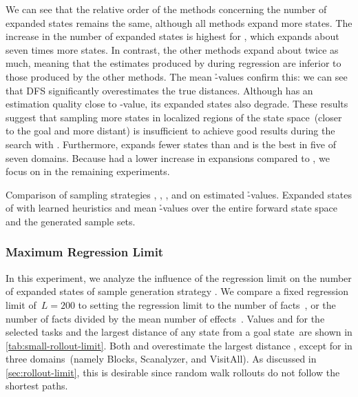 We can see that the relative order of the methods concerning the number of expanded states remains the same, although all methods expand more states. The increase in the number of expanded states is highest for \hnnl{\dfs}, which expands about seven times more states. In contrast, the other methods expand about twice as much, meaning that the estimates produced by \dfs during regression are inferior to those produced by the other methods. The mean \h-values confirm this: we can see that DFS significantly overestimates the true distances. Although \bfs has an estimation quality close to \hstar-value, its expanded states also degrade. These results suggest that sampling more states in localized regions of the state space~(\bfs closer to the goal and \dfs more distant) is insufficient to achieve good results during the search with \gbfs. Furthermore, \hnnl{\bfsrw} expands fewer states than \hnnl{\rw} and is the best in five of seven domains. Because \hnnl{\bfsrw} had a lower increase in expansions compared to \hnnl{\rw}, we focus on \bfsrw in the remaining experiments.

\begin{table}[tb]
    \caption[Comparison of sampling strategies on estimated \h-values.]{Comparison of sampling strategies \bfs, \dfs, \rw, and \bfsrw on estimated \h-values. Expanded states of \gbfs with learned heuristics and mean \h-values over the entire forward state space and the generated sample sets.}
    \label{tab:small-sampling-h}
    \addmargin
    \centering
    
\end{table}

\subsubsection{Maximum Regression Limit}
\label{sec:small-exps-rollout-limit}

In this experiment, we analyze the influence of the regression limit on the number of expanded states of sample generation strategy \bfsrw. We compare a fixed regression limit of~$L=200$ to setting the regression limit to the number of facts~\facts, or the number of facts divided by the mean number of effects~\meanfx. Values \facts and \meanfx for the selected tasks and the largest distance of any state from a goal state~\ssdiameter are shown in \cref{tab:small-rollout-limit}. Both \facts and \meanfx overestimate the largest distance \ssdiameter, except for \meanfx in three domains~(namely Blocks, Scanalyzer, and VisitAll). As discussed in \cref{sec:rollout-limit}, this is desirable since random walk rollouts do not follow the shortest paths.

